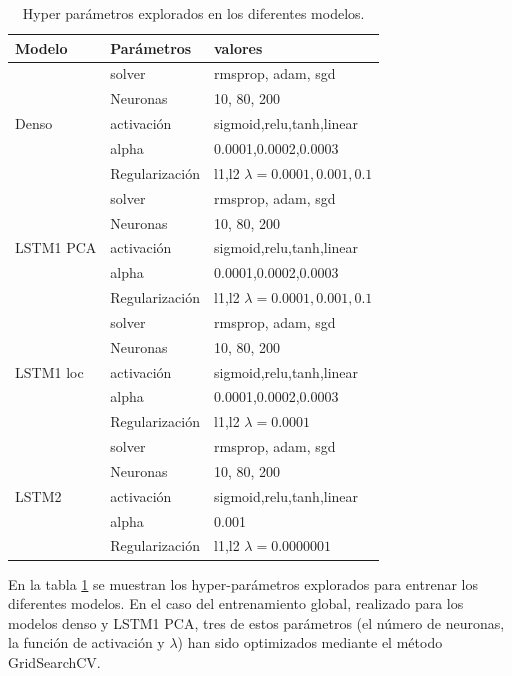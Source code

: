  \begin{table}[h!]
  \begin{center} 
  \begin{tabular}{|l|l|l|}
    \hline
   Modelo&Parámetros &  valores \\
   \hline
   &solver &  rmsprop, adam, sgd\\
   &Neuronas &  10, 80, 200 \\
   Denso &activación & sigmoid,relu,tanh,linear \\
   &alpha &  0.0001,0.0002,0.0003 \\
   &Regularización & l1,l2 $\lambda = 0.0001,0.001,0.1$  \\
   \hline
   &solver &   rmsprop, adam, sgd\\
   &Neuronas &  10, 80, 200 \\
   LSTM1 PCA &activación & sigmoid,relu,tanh,linear \\
   &alpha &  0.0001,0.0002,0.0003 \\
   &Regularización & l1,l2 $\lambda =0.0001,0.001,0.1$  \\

   \hline
   &solver &   rmsprop, adam, sgd\\
   &Neuronas &  10, 80, 200 \\
   LSTM1 loc &activación & sigmoid,relu,tanh,linear \\
   &alpha &  0.0001,0.0002,0.0003 \\
   &Regularización & l1,l2 $\lambda =0.0001$  \\

   \hline
   &solver &   rmsprop, adam, sgd\\
   &Neuronas &  10, 80, 200 \\
   LSTM2 &activación & sigmoid,relu,tanh,linear \\
   &alpha & 0.001 \\
   &Regularización & l1,l2 $\lambda =0.0000001$  \\
   \hline

  \end{tabular}
  \caption{ Hyper parámetros explorados en los diferentes modelos.}
  \label{hyper}
\end{center}
  \end{table}


  En la tabla \ref{hyper} se muestran los hyper-parámetros explorados para entrenar los diferentes modelos. En el caso
  del entrenamiento global, realizado para los modelos denso y LSTM1 PCA, tres de 
  estos parámetros (el número de neuronas, la función de activación y $\lambda$) 
  han sido optimizados mediante el método GridSearchCV.


